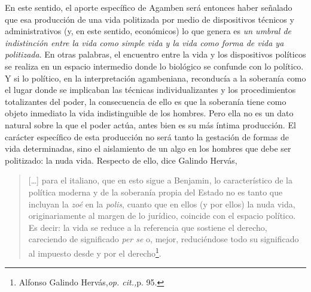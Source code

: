 En este sentido, el aporte específico de Agamben será entonces haber señalado que esa producción de una vida politizada por medio de dispositivos técnicos y administrativos (y, en este sentido, económicos) lo que genera es \emph{un umbral de indistinción entre la vida como simple vida y la vida como forma de vida ya politizada}. En otras palabras, el encuentro entre la vida y los dispositivos políticos se realiza en un espacio intermedio donde lo biológico se confunde con lo político. Y si lo político, en la interpretación agambeniana, reconducía a la soberanía como el lugar donde se implicaban las técnicas individualizantes y los procedimientos totalizantes del poder, la consecuencia de ello es que la soberanía tiene como objeto inmediato la vida indistinguible de los hombres. Pero ella no es un dato natural sobre la que el poder actúa, antes bien es su más íntima producción. El carácter específico de esta producción no será tanto la gestación de formas de vida determinadas, sino el aislamiento de un algo en los hombres que debe ser politizado: la nuda vida. Respecto de ello, dice Galindo Hervás,

\begin{quote}
{[}\ldots{]} para el italiano, que en esto sigue a Benjamin, lo característico de la política moderna y de la soberanía propia del Estado no es tanto que incluyan la \emph{zoé} en la \emph{polis}, cuanto que en ellos (y por ellos) la nuda vida, originariamente al margen de lo jurídico, coincide con el espacio político. Es decir: la vida se reduce a la referencia que sostiene el derecho, careciendo de significado \emph{per se} o, mejor, reduciéndose todo su significado al impuesto desde y por el derecho\footnote{Alfonso Galindo Hervás,\emph{op. cit.,}p. 95.}.
\end{quote}

